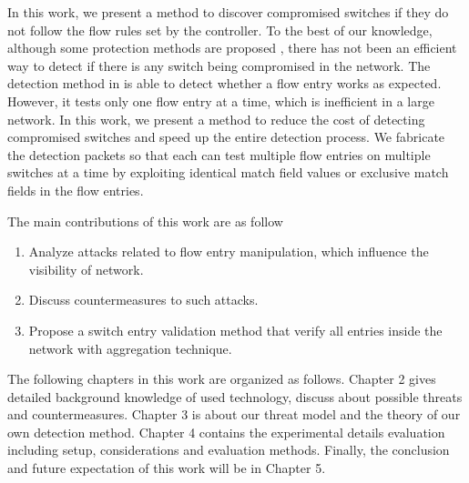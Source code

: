 In this work, we present a method to discover compromised switches if they do not follow the flow rules set by the controller. To the best of our knowledge, although some protection methods are proposed \cite{CKGL15}, there has not been an efficient way to detect if there is any switch being compromised in the network. The detection method in \cite{CKGL15} is able to detect whether a flow entry works as expected. However, it tests only one flow entry at a time, which is inefficient in a large network. In this work, we present a method to reduce the cost of detecting compromised switches and speed up the entire detection process. We fabricate the detection packets so that each can test multiple flow entries on multiple switches at a time by exploiting identical match field values or exclusive match fields in the flow entries. 

The main contributions of this work are as follow 
\begin{enumerate}
\item
Analyze attacks related to flow entry manipulation, which influence the visibility of network.
\item
Discuss countermeasures to such attacks.
\item
Propose a switch entry validation method that verify all entries inside the network with aggregation technique.
\end{enumerate}

The following chapters in this work are organized as follows. Chapter 2 gives detailed background knowledge of used technology, discuss about possible threats and countermeasures. Chapter 3 is about our threat model and the theory of our own detection method. Chapter 4 contains the experimental details evaluation including setup, considerations and evaluation methods. Finally, the conclusion and future expectation of this work will be in Chapter 5.